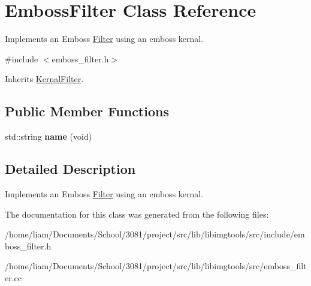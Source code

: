 \hypertarget{classEmbossFilter}{}\section{Emboss\+Filter Class Reference}
\label{classEmbossFilter}


Implements an Emboss \hyperlink{classFilter}{Filter} using an emboss kernal.  




{\ttfamily \#include $<$emboss\+\_\+filter.\+h$>$}



Inherits \hyperlink{classKernalFilter}{Kernal\+Filter}.

\subsection*{Public Member Functions}
\begin{DoxyCompactItemize}
\item 
std\+::string {\bfseries name} (void)\hypertarget{classEmbossFilter_a2df0ab62fdbcee6ca5c44fc0dac71adf}{}\label{classEmbossFilter_a2df0ab62fdbcee6ca5c44fc0dac71adf}

\end{DoxyCompactItemize}


\subsection{Detailed Description}
Implements an Emboss \hyperlink{classFilter}{Filter} using an emboss kernal. 

The documentation for this class was generated from the following files\+:\begin{DoxyCompactItemize}
\item 
/home/liam/\+Documents/\+School/3081/project/src/lib/libimgtools/src/include/emboss\+\_\+filter.\+h\item 
/home/liam/\+Documents/\+School/3081/project/src/lib/libimgtools/src/emboss\+\_\+filter.\+cc\end{DoxyCompactItemize}
